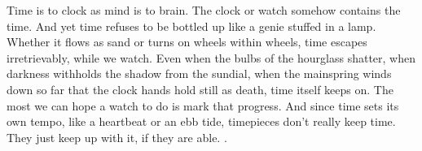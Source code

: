 


\vspace*{10cm}
\begin{citacao}
Time is to clock as mind is to brain. The clock or watch somehow contains the time. And yet time refuses to be bottled up like a genie stuffed in a lamp. Whether it flows as sand or turns on wheels within wheels, time escapes irretrievably, while we watch. Even when the bulbs of the hourglass shatter, when darkness withholds the shadow from the sundial, when the mainspring winds down so far that the clock hands hold still as death, time itself keeps on. The most we can hope a watch to do is mark that progress. And since time sets its own tempo, like a heartbeat or an ebb tide, timepieces don’t really keep time. They just keep up with it, if they are able. \cite{manualufpe2020}.
\end{citacao}

    \vspace*{5cm}
	
		
	
\newpage